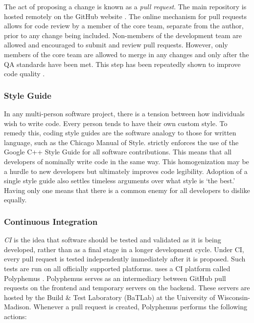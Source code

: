 The act of proposing a change is known as a \emph{pull request}. The main \Cyclus repository is 
hosted remotely on the GitHub website \cite{dabbish_social_2012}. The online
mechanism for pull requests allows for code review by a member of the \Cyclus 
core team, separate from the author, prior to any change being included. Non-members
of the \Cyclus development team are allowed and encouraged to submit and review 
pull requests. However, only members of the \Cyclus core team are allowed to 
merge in any changes and only after the \gls{QA} standards have been met. This 
step has been repeatedly shown to improve code quality \cite{cohen_modern_2010}.

\subsubsection{Style Guide}

In any multi-person software project, there is a tension between how individuals
wish to write code. Every person tends to have their own custom style. To remedy this,
coding style guides are the software analogy to those for written language,
such as the Chicago Manual of Style. \Cyclus strictly enforces the use of the 
Google C++ Style Guide \cite{weinberger_google_2008} for all software contributions.
This means that all developers of \Cyclus nominally write \Cyclus code in the same 
way.  This homogenization may be a hurdle to new developers but ultimately 
improves code legibility. Adoption of a single style guide also settles
timeless arguments over what style is `the best.' Having only one means that 
there is a common enemy for all developers to dislike equally.

\subsubsection{Continuous Integration}
\label{sec:qa-ci}

\emph{\acrfull{CI}} is the idea that software should be tested and validated 
as it is being developed, rather than as a final stage in a longer development 
cycle.  Under \gls{CI}, every pull request is tested independently immediately after 
it is proposed. Such tests are run on all officially supported platforms. 
\Cyclus uses a \gls{CI} platform called Polyphemus \cite{scopatz_polyphemus_2014}. Polyphemus serves as an intermediary between GitHub pull requests on the frontend 
and temporary \Cyclus servers on the backend. These servers are hosted by 
the Build \& Test Laboratory (BaTLab) \cite{uw_batlab_team_batlab_2014} at the University of 
Wisconsin-Madison. Whenever a pull request is created, Polyphemus performs 
the following actions:

